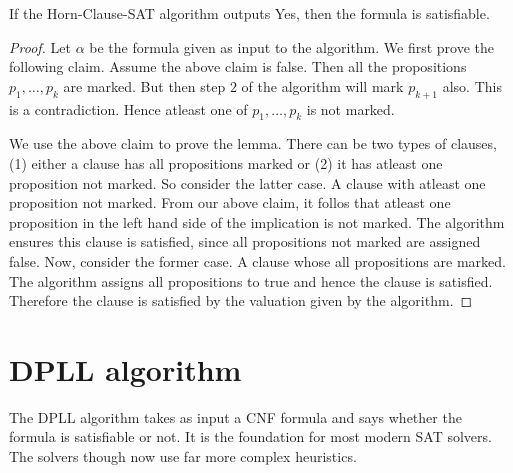 \begin{lemma}
If the Horn-Clause-SAT algorithm outputs Yes, then the formula is satisfiable.
\end{lemma}
\begin{proof}
Let $\alpha$ be the formula given as input to the algorithm. We first prove the following claim.
Assume the above claim is false. Then all the propositions $p_1,\dots,p_k$ are marked. But then step $2$ of the algorithm will mark $p_{k+1}$ also. This is a contradiction. Hence atleast one of $p_1,\dots,p_k$ is not marked. 

We use the above claim to prove the lemma. There can be two types of clauses, (1) either a clause has all propositions marked or (2) it has atleast one proposition not marked. So consider the latter case. A clause with atleast one proposition not marked. From our above claim, it follos that atleast one proposition in the left hand side of the implication is not marked. The algorithm ensures this clause is satisfied, since all propositions not marked are assigned false. Now, consider the former case. A clause whose all propositions are marked. The algorithm assigns all propositions to true and hence the clause is satisfied. Therefore the clause is satisfied by the valuation given by the algorithm.
\end{proof}

\section{DPLL algorithm}
The DPLL algorithm takes as input a CNF formula and says whether the formula is satisfiable or not. It is the foundation for most modern SAT solvers. The solvers though now use far more complex heuristics. 

